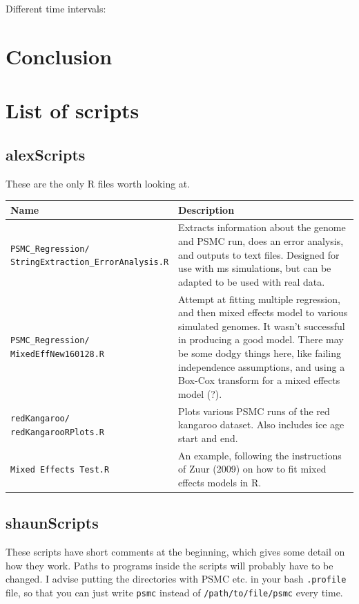 \documentclass[11pt,a4paper]{article}
\begin{document}
Different time intervals:


\section{Conclusion}


{}
\newpage

\appendix
\section{List of scripts}
\subsection{alexScripts}
These are the only R files worth looking at.
\begin{table}[h]
\begin{tabular}{p{6.5cm}p{8.5cm}}
  \hline
  \textbf{Name} & \textbf{Description} \\ 
  \hline
\parbox[t]{5cm}{\texttt{PSMC\_Regression/}\\ \texttt{StringExtraction\_ErrorAnalysis.R}} & Extracts information about the genome and PSMC run, does an error analysis, and outputs to text files. Designed for use with ms simulations, but can be adapted to be used with real data.\\ \hline
  \parbox[t]{5cm}{\texttt{PSMC\_Regression/}\\ \texttt{MixedEffNew160128.R}} & Attempt at fitting multiple regression, and then mixed effects model to various simulated genomes. It wasn't successful in producing a good model. There may be some dodgy things here, like failing independence assumptions, and using a Box-Cox transform for a mixed effects model (?). \\ \hline
  \parbox[t]{5cm}{\texttt{redKangaroo/}\\ \texttt{redKangarooRPlots.R}} & Plots various PSMC runs of the red kangaroo dataset. Also includes ice age start and end. \\ \hline
  \texttt{Mixed Effects Test.R} & An example, following the instructions of Zuur (2009) on how to fit mixed effects models in R. \\
  \hline
\end{tabular}
\end{table}

\subsection{shaunScripts}
These scripts have short comments at the beginning, which gives some detail on how they work. Paths to programs inside the scripts will probably have to be changed. I advise putting the directories with PSMC etc. in your bash \verb|.profile| file, so that you can just write \verb|psmc| instead of \verb|/path/to/file/psmc| every time.
\end{document}
